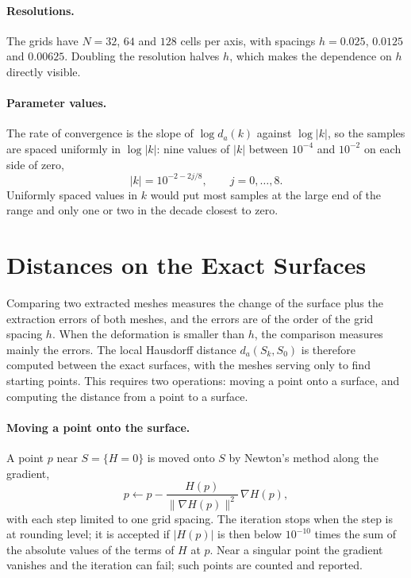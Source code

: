 \paragraph{Resolutions.} The grids have $N=32$, $64$ and $128$ cells per axis,
with spacings $h=0.025$, $0.0125$ and $0.00625$. Doubling the resolution
halves $h$, which makes the dependence on $h$ directly visible.

\paragraph{Parameter values.} The rate of convergence is the slope of
$\log d_a(k)$ against $\log|k|$, so the samples are spaced uniformly in
$\log|k|$: nine values of $|k|$ between $10^{-4}$ and $10^{-2}$ on each side
of zero,
\begin{equation}
\label{eq:k-samples}
|k|=10^{-2-2j/8},\qquad j=0,\dots,8 .
\end{equation}
Uniformly spaced values in $k$ would put most samples at the large end of the
range and only one or two in the decade closest to zero.

\section{Distances on the Exact Surfaces}
\label{sec:method-exact}

Comparing two extracted meshes measures the change of the surface plus the
extraction errors of both meshes, and the errors are of the order of the grid
spacing $h$. When the deformation is smaller than $h$, the comparison measures
mainly the errors. The local Hausdorff distance $d_a(S_k,S_0)$ is therefore
computed between the exact surfaces, with the meshes serving only to find
starting points. This requires two operations: moving a point onto a surface,
and computing the distance from a point to a surface.

\paragraph{Moving a point onto the surface.}
A point $p$ near $S=\{H=0\}$ is moved onto $S$ by Newton's method along the
gradient,
\begin{equation}
\label{eq:projection}
p\leftarrow p-\frac{H(p)}{\|\nabla H(p)\|^2}\,\nabla H(p),
\end{equation}
with each step limited to one grid spacing. The iteration stops when the step
is at rounding level; it is accepted if $|H(p)|$ is then below $10^{-10}$ times
the sum of the absolute values of the terms of $H$ at $p$. Near a singular
point the gradient vanishes and the iteration can fail; such points are
counted and reported.

